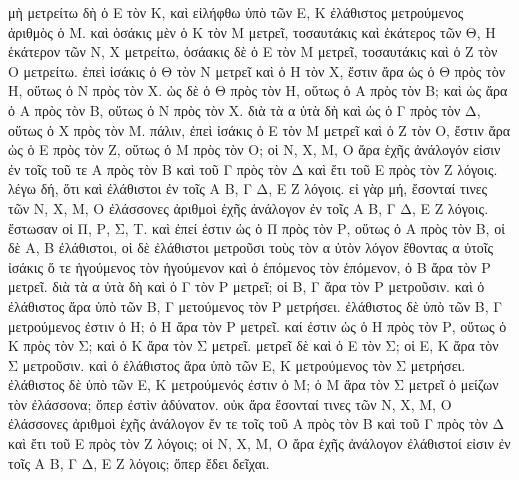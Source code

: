 \begin{Parallel}{}{}
{\epsfysize=2.5in
\centerline{}

{\greekfont μὴ μετρείτω δὴ ὁ Ε τὸν Κ, καὶ εἰλήφθω ὑπὸ τῶν Ε, Κ ἐλάθιστος
μετρούμενος ἀριθμὸς ὁ Μ. καὶ ὁσάκις μὲν ὁ Κ τὸν Μ
μετρεῖ, τοσαυτάκις καὶ ἑκάτερος τῶν Θ, Η ἑκάτερον τῶν Ν, Χ μετρείτω,
ὁσάακις δὲ ὁ Ε τὸν Μ μετρεῖ, τοσαυτάκις καὶ ὁ Ζ τὸν Ο μετρείτω.
ἐπεὶ ἰσάκις ὁ Θ τὸν Ν μετρεῖ καὶ ὁ Η τὸν Χ, ἔστιν ἄρα
ὡς ὁ Θ πρὸς τὸν Η, οὕτως ὁ Ν πρὸς τὸν Χ. ὡς δὲ ὁ Θ πρὸς τὸν Η,
οὕτως ὁ Α πρὸς τὸν Β; καὶ ὡς ἄρα ὁ Α πρὸς τὸν Β, οὕτως
ὁ Ν πρὸς τὸν Χ.  διὰ
τὰ α ὐτὰ δὴ καὶ ὡς ὁ Γ πρὸς τὸν Δ, οὕτως ὁ Χ πρὸς τὸν Μ. πάλιν,
ἐπεὶ ἰσάκις ὁ Ε  τὸν Μ μετρεῖ καὶ ὁ Ζ τὸν Ο, ἔστιν ἄρα
ὡς ὁ Ε πρὸς  τὸν Ζ, οὕτως ὁ Μ πρὸς τὸν Ο; οἱ Ν, Χ, Μ, Ο
ἄρα ἑχῆς ἀνάλογόν εἰσιν ἐν τοῖς τοῦ τε Α πρὸς τὸν Β καὶ τοῦ
Γ πρὸς  τὸν Δ καὶ ἔτι τοῦ Ε πρὸς τὸν Ζ λόγοις. λέγω δή, ὅτι καὶ
ἐλάθιστοι ἐν τοῖς Α Β, Γ Δ, Ε Ζ λόγοις. εἰ  γὰρ μή, ἔσονταί τινες τῶν Ν, Χ, Μ, Ο
ἐλάσσονες ἀριθμοὶ ἑχῆς ἀνάλογον ἐν τοῖς Α Β, Γ Δ, Ε Ζ
λόγοις. ἔστωσαν οἱ Π, Ρ, Σ, Τ. καὶ ἐπεί ἐστιν ὡς ὁ Π πρὸς τὸν Ρ,
οὕτως ὁ Α πρὸς τὸν Β, οἱ δὲ Α, Β ἐλάθιστοι, οἱ δὲ ἐλάθιστοι
μετροῦσι τοὺς τὸν α ὐτὸν λόγον ἔθοντας
α ὐτοῖς ἰσάκις ὅ τε ἡγούμενος τὸν ἡγούμενον καὶ ὁ ἑπόμενος
τὸν ἑπόμενον, ὁ Β ἄρα τὸν Ρ μετρεῖ. διὰ τὰ α ὐτὰ δὴ καὶ ὁ Γ τὸν
Ρ μετρεῖ; οἱ Β, Γ ἄρα τὸν Ρ μετροῦσιν. καὶ ὁ ἐλάθιστος ἄρα ὑπὸ
τῶν Β, Γ μετούμενος τὸν Ρ μετρήσει. ἐλάθιστος δὲ ὑπὸ τῶν
Β, Γ μετρούμενος ἐστιν ὁ Η; ὁ Η ἄρα τὸν Ρ μετρεῖ.
καί ἐστιν ὡς ὁ Η πρὸς τὸν  Ρ, οὕτως ὁ Κ πρὸς τὸν Σ; καὶ
ὁ Κ ἄρα τὸν Σ μετρεῖ. μετρεῖ δὲ καὶ ὁ Ε τὸν Σ; οἱ Ε, Κ
ἄρα τὸν Σ
μετροῦσιν. καὶ ὁ ἐλάθιστος ἄρα ὑπὸ τῶν
Ε, Κ μετρούμενος τὸν Σ μετρήσει. ἐλάθιστος δὲ ὑπὸ τῶν Ε, Κ
μετρούμενός ἐστιν ὁ Μ; ὁ Μ ἄρα τὸν Σ μετρεῖ ὁ μείζων
τὸν ἐλάσσονα; ὅπερ ἐστὶν ἀδύνατον. οὐκ ἄρα ἔσονταί τινες τῶν
Ν, Χ, Μ, Ο ἐλάσσονες ἀριθμοὶ ἑχῆς ἀνάλογον ἔν τε τοῖς
τοῦ Α πρὸς τὸν Β καὶ τοῦ Γ πρὸς τὸν Δ καὶ ἔτι τοῦ Ε πρὸς τὸν
Ζ λόγοις; οἱ Ν, Χ, Μ, Ο ἄρα ἑχῆς ἀνάλογον ἐλάθιστοί εἰσιν
ἐν τοῖς Α Β, Γ Δ, Ε Ζ λόγοις; ὅπερ ἔδει δεῖχαι.}}

\end{Parallel}
